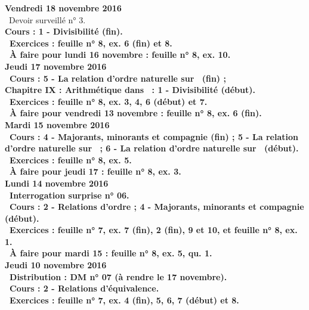 \documentclass[12pt,a4paper]{article}
\begin{document}
\noindent\textbf{Vendredi 18 novembre 2016}\\
\bu\ Devoir surveillé n° 3.\\
\bf Cours : 1 - Divisibilité (fin).\\
\bu\ Exercices : feuille n° 8, ex. 6 (fin) et 8.\\
\bu\ À faire pour lundi 16 novembre : feuille n° 8, ex. 10.\vspace{.4cm}\\
 
\noindent\textbf{Jeudi 17 novembre 2016}\\
\bu\ Cours : 5 - La relation d'ordre naturelle sur \R\ (fin) ;\\
\bf Chapitre IX \rm : Arithmétique dans \Z\ : 1 - Divisibilité (début).\\
\bu\ Exercices : feuille n° 8, ex. 3, 4, 6 (début) et 7.\\
\bu\ À faire pour vendredi 13 novembre : feuille n° 8, ex. 6 (fin).\vspace{.4cm}\\

\noindent\textbf{Mardi 15 novembre 2016}\\
\bu\ Cours : 4 - Majorants, minorants et compagnie (fin) ; 5 - La relation d'ordre naturelle sur \N\ ; 6 - La relation 
d'ordre naturelle sur \R\ (début).\\
\bu\ Exercices : feuille n° 8, ex. 5.\\
\bu\ À faire pour jeudi 17 : feuille n° 8, ex. 3.\vspace{.4cm}\\

\noindent\textbf{Lundi 14 novembre 2016}\\
\bu\ Interrogation surprise n° 06.\\
\bu\ Cours : 2 - Relations d'ordre ;  4 - Majorants, minorants et compagnie (début).\\
\bu\ Exercices : feuille n° 7, ex. 7 (fin), 2 (fin), 9 et 10, et feuille n° 8, ex. 1.\\
\bu\ À faire pour mardi 15 : feuille n° 8, ex. 5, qu. 1.\vspace{.4cm}\\

\noindent\textbf{Jeudi 10 novembre 2016}\\
\bu\ Distribution : DM n° 07 (à rendre le 17 novembre).\\
\bu\ Cours : 2 - Relations d'équivalence.\\
\bu\ Exercices : feuille n° 7, ex. 4 (fin), 5, 6, 7 (début) et 8.\vspace{.4cm}\\
\end{document}
